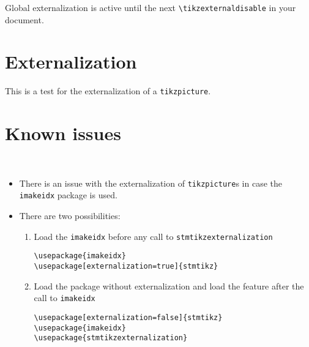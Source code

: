 \documentclass[%
  type=article,%
  layout=koma,%
  date=true,%
  hyperref=true,%
  listings=true,%
  tikz=false,%
]{stmtext}
\begin{document}
Global externalization is active until the next \texttt{\textbackslash tikzexternaldisable} in your document.

\section{Externalization}

This is a test for the externalization of a \texttt{tikzpicture}.

\begin{figure}[htbp]
\centering
\tikzexternalenable
{}
\tikzexternaldisable
\end{figure}

\section{Known issues}

\begin{description}[leftmargin=\parindent,labelindent=\parindent,style=nextline]
% 
\item[\texttt{misplaced \textbackslash printindex} error.]\mbox{}\\[-2.0\baselineskip]%
  \begin{itemize}[noitemsep]
    \item There is an issue with the externalization of \texttt{tikzpicture}s in case the \texttt{imakeidx} package is used.
    \item There are two possibilities:
    \begin{enumerate}
      \item Load the \texttt{imakeidx} before any call to \texttt{stmtikzexternalization}
\begin{verbatim}
\usepackage{imakeidx}
\usepackage[externalization=true]{stmtikz}
\end{verbatim}
      \item Load the package without externalization and load the feature after the call to  \texttt{imakeidx}
\begin{verbatim}
\usepackage[externalization=false]{stmtikz}
\usepackage{imakeidx}
\usepackage{stmtikzexternalization}
\end{verbatim}
    \end{enumerate}

  \end{itemize}
%
\end{description}
\end{document}
